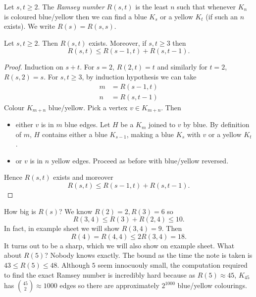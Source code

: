 \documentclass[a4paper]{article}
\begin{document}
\begin{definition}
  Let \(s, t \geq 2\). The \emph{Ramsey number} \(R(s, t)\) is the least \(n\) such that whenever \(K_n\) is coloured blue/yellow then we can find a blue \(K_s\) or a yellow \(K_t\) (if such an \(n\) exists). We write \(R(s) = R(s, s)\).
\end{definition}

\begin{theorem}[Ramsey]
  Let \(s, t \geq 2\). Then \(R(s, t)\) exists. Moreover, if \(s, t \geq 3\) then
  \[
    R(s, t) \leq R(s - 1, t) + R(s, t - 1).
  \]
\end{theorem}

\begin{proof}
  Induction on \(s + t\). For \(s = 2\), \(R(2, t) = t\) and similarly for \(t = 2\), \(R(s, 2) = s\). For \(s, t \geq 3\), by induction hypothesis we can take
  \begin{align*}
    m &= R(s - 1, t) \\
    n &= R(s, t -1)
  \end{align*}
  Colour \(K_{m + n}\) blue/yellow. Pick a vertex \(v \in K_{m + n}\). Then
  \begin{itemize}
  \item either \(v\) is in \(m\) blue edges. Let \(H\) be a \(K_m\) joined to \(v\) by blue. By definition of \(m\), \(H\) contains either a blue \(K_{s - 1}\), making a blue \(K_s\) with \(v\) or a yellow \(K_t\).
  \item or \(v\) is in \(n\) yellow edges. Proceed as before with blue/yellow reversed.
  \end{itemize}
  Hence \(R(s, t)\) exists and moreover
  \[
    R(s, t) \leq R(s- 1, t) + R(s, t - 1).
  \]
\end{proof}

How big is \(R(s)\)? We know \(R(2) = 2, R(3) = 6\) so
\[
  R(3, 4) \leq R(3) + R(2, 4) \leq 10.
\]
In fact, in example sheet we will show \(R(3, 4) = 9\). Then
\[
  R(4) = R(4, 4) \leq 2R(3, 4) = 18.
\]
It turns out to be a sharp, which we will also show on example sheet. What about \(R(5)\)? Nobody knows exactly. The bound as the time the note is taken is \(43 \leq R(5) \leq 48\). Although \(5\) seem innocuouly small, the computation required to find the exact Ramsey number is incredibly hard because as \(R(5) \approx 45\), \(K_{45}\) has \(\binom{45}{2} \approx 1000\) edges so there are approximately \(2^{1000}\) blue/yellow colourings.
\end{document}
